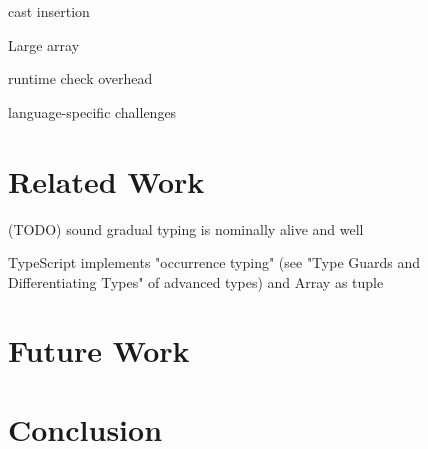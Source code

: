 cast insertion

Large array

runtime check overhead

language-specific challenges



\renewcommand{\thechapter}{4}
\chapter{Related Work}

(TODO) sound gradual typing is nominally alive and well


TypeScript implements "occurrence typing" (see "Type Guards and Differentiating Types" of advanced types) and Array as tuple 
\renewcommand{\thechapter}{5}

\chapter{Future Work}

\renewcommand{\thechapter}{6}
\chapter{Conclusion}